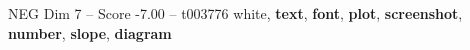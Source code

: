 \begin{textsample}{NEG Dim 7 – Score -7.00 – t003776}  \label{ex:f7_neg_035}
white, \textbf{text}, \textbf{font}, \textbf{plot}, \textbf{screenshot}, \textbf{number}, \textbf{slope}, \textbf{diagram}

\end{textsample}
